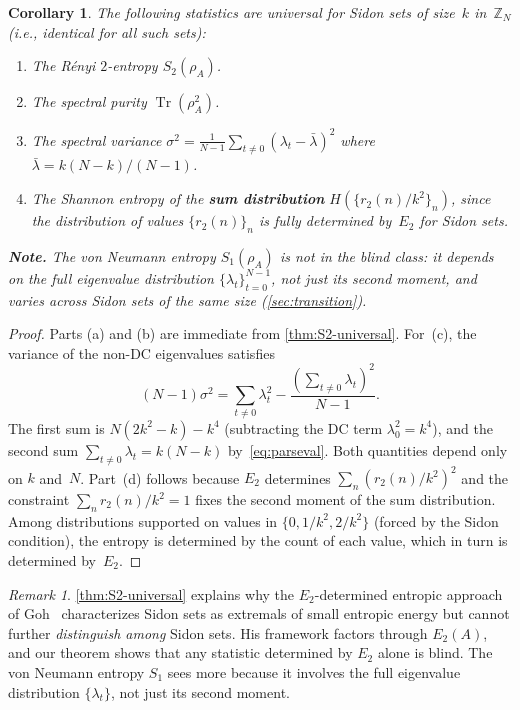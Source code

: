 \documentclass[11pt]{article}
\newtheorem{corollary}[theorem]{Corollary}
\theoremstyle{definition}
\theoremstyle{remark}
\newtheorem{remark}[theorem]{Remark}
\newcommand{\Z}{\mathbb{Z}}
\newcommand{\Tr}{\operatorname{Tr}}
\begin{document}
\begin{corollary}\label{cor:blind}
The following statistics are \emph{universal} for Sidon sets of size~$k$
in~$\Z_N$ (i.e., identical for all such sets):
\begin{enumerate}[label=(\alph*)]
\item The R\'enyi $2$-entropy $S_2(\rho_A)$.
\item The spectral purity $\Tr(\rho_A^2)$.
\item The spectral variance
$\sigma^2 = \frac{1}{N-1}\sum_{t \ne 0}(\lambda_t - \bar\lambda)^2$
where $\bar\lambda = k(N-k)/(N-1)$.
\item The Shannon entropy of the \textbf{sum distribution}
$H(\{r_2(n)/k^2\}_n)$, since the distribution of values
$\{r_2(n)\}_n$ is fully determined by~$E_2$ for Sidon sets.
\end{enumerate}
\textbf{Note.} The von Neumann entropy $S_1(\rho_A)$ is
\emph{not} in the blind class: it depends on the full
eigenvalue distribution $\{\lambda_t\}_{t=0}^{N-1}$,
not just its second moment, and varies across Sidon
sets of the same size (\cref{sec:transition}).
\end{corollary}

\begin{proof}
Parts (a) and (b) are immediate from \cref{thm:S2-universal}.
For~(c), the variance of the non-DC eigenvalues satisfies
\[
  (N-1)\sigma^2 = \sum_{t \ne 0} \lambda_t^2
  - \frac{(\sum_{t \ne 0} \lambda_t)^2}{N-1}.
\]
The first sum is $N(2k^2-k) - k^4$ (subtracting the DC term
$\lambda_0^2 = k^4$), and the second sum $\sum_{t \ne 0}\lambda_t = k(N-k)$
by~\eqref{eq:parseval}.  Both quantities depend only on $k$
and~$N$.
Part~(d) follows because $E_2$ determines
$\sum_n (r_2(n)/k^2)^2$ and the constraint
$\sum_n r_2(n)/k^2 = 1$ fixes the second moment of the sum
distribution.  Among distributions supported on values in
$\{0, 1/k^2, 2/k^2\}$ (forced by the Sidon condition), the
entropy is determined by the count of each value, which in turn
is determined by~$E_2$.
\end{proof}

\begin{remark}
\cref{thm:S2-universal} explains why the $E_2$-determined entropic
approach of Goh~\cite{Goh2024} characterizes Sidon sets as extremals
of small entropic energy but cannot further \emph{distinguish among}
Sidon sets.  His framework factors through $E_2(A)$, and our theorem
shows that any statistic determined by $E_2$ alone is blind.
The von Neumann entropy $S_1$ sees more because it involves the
full eigenvalue distribution $\{\lambda_t\}$, not just its second
moment.
\end{remark}
\end{document}
